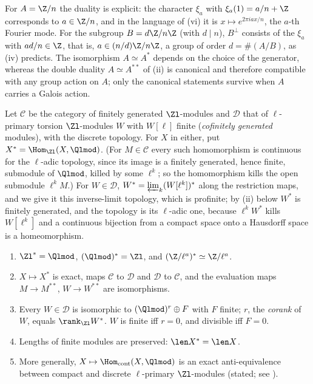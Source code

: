For $A=\Z/n$ the duality is explicit: the character $\xi_a$ with $\xi_a(1)=a/n+\Z$ corresponds to $a\in\Z/n$, and in the language of (vi) it is
$x\mapsto e^{2\pi iax/n}$, the $a$-th Fourier mode. For the subgroup $B=d\Z/n\Z$ (with $d\mid n$), $B^\perp$ consists of the $\xi_a$ with $ad/n\in\Z$,
that is, $a\in(n/d)\Z/n\Z$, a group of order $d=\#(A/B)$, as (iv) predicts. The isomorphism $A\simeq A^*$ depends on the choice of the generator,
whereas the double duality $A\simeq A^{**}$ of (ii) is canonical and therefore compatible with any group action on $A$; only
the canonical statements survive when $A$ carries a Galois action.

\begin{theorem}\label{thm:modules:pontryagin-zl}
Let $\mathcal C$ be the category of finitely generated $\Zl$-modules and $\mathcal D$ that of $\ell$-primary torsion $\Zl$-modules $W$ with $W[\ell]$ finite
(\emph{cofinitely generated} modules), with the discrete topology. For $X$ in either, put $X^*=\Hom_{\Zl}(X,\Qlmod)$. (For $M\in\mathcal C$ every such
homomorphism is continuous for the $\ell$-adic topology, since its image is a finitely generated, hence finite, submodule of $\Qlmod$, killed by
some $\ell^k$; so the homomorphism kills the open submodule $\ell^kM$.) For $W\in\mathcal D$, $W^*=\varprojlim_k(W[\ell^k])^*$ along the restriction
maps, and we give it this inverse-limit topology, which is profinite; by (ii) below $W^*$ is finitely generated, and the topology is its
$\ell$-adic one, because $\ell^kW^*$ kills $W[\ell^k]$ and a continuous bijection from a compact space onto a Hausdorff space is a homeomorphism.
\begin{enumerate}[label=(\roman*)]
\item $\Zl^*=\Qlmod$, $(\Qlmod)^*=\Zl$, and $(\Z/\ell^a)^*\simeq\Z/\ell^a$.
\item $X\mapsto X^*$ is exact, maps $\mathcal C$ to $\mathcal D$ and $\mathcal D$ to $\mathcal C$, and the evaluation maps $M\to M^{**}$, $W\to W^{**}$ are isomorphisms.
\item Every $W\in\mathcal D$ is isomorphic to $(\Qlmod)^r\oplus F$ with $F$ finite; $r$, the \emph{corank} of $W$, equals $\rank_{\Zl}W^*$. $W$ is finite iff
$r=0$, and divisible iff $F=0$.
\item Lengths of finite modules are preserved: $\len X^*=\len X$.
\item More generally, $X\mapsto\Hom_{\mathrm{cont}}(X,\Qlmod)$ is an exact anti-equivalence between compact and discrete $\ell$-primary $\Zl$-modules (stated;
see \cite[Chapter I, Section 1]{NSW}).
\end{enumerate}
\end{theorem}

